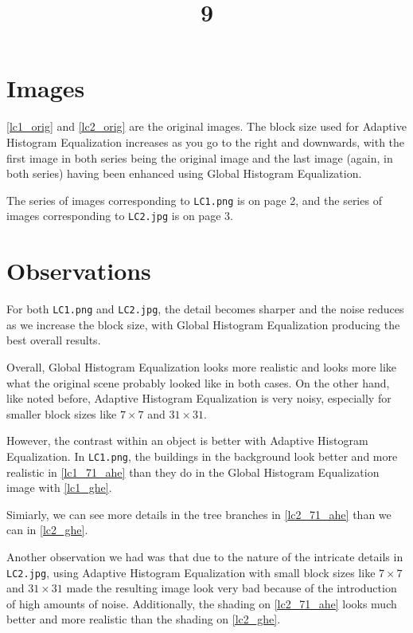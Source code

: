 \documentclass[a4paper, landscape]{article}
\title{9}
\date{}
\begin{document}
\maketitle

\section{Images}
\ref{lc1_orig} and \ref{lc2_orig} are the original images. The block size used for Adaptive Histogram Equalization increases as you go to the right and downwards, with the first image in both series being the original image and the last image (again, in both series) having been enhanced using Global Histogram Equalization.

The series of images corresponding to \texttt{LC1.png} is on page 2, and the series of images corresponding to \texttt{LC2.jpg} is on page 3.

\section{Observations}

For both \texttt{LC1.png} and \texttt{LC2.jpg}, the detail becomes sharper and the noise reduces as we increase the block size, with Global Histogram Equalization producing the best overall results.

Overall, Global Histogram Equalization looks more realistic and looks more like what the original scene probably looked like in both cases. On the other hand, like noted before, Adaptive Histogram Equalization is very noisy, especially for smaller block sizes like $7\times 7$ and $31\times 31$.

However, the contrast within an object is better with Adaptive Histogram Equalization. In \texttt{LC1.png}, the buildings in the background look better  and more realistic in \ref{lc1_71_ahe} than they do in the Global Histogram Equalization image with \ref{lc1_ghe}.

Simiarly, we can see more details in the tree branches in \ref{lc2_71_ahe} than we can in \ref{lc2_ghe}.

Another observation we had was that due to the nature of the intricate details in \texttt{LC2.jpg}, using Adaptive Histogram Equalization with small block sizes like $7\times 7$ and $31\times 31$ made the resulting image look very bad because of the introduction of high amounts of noise. Additionally, the shading on \ref{lc2_71_ahe} looks much better and more realistic than the shading on \ref{lc2_ghe}.
\end{document}
